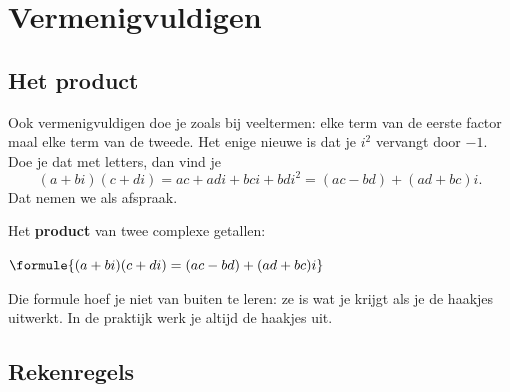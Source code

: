 
\begin{oefeningen}

\end{oefeningen}

\section{Vermenigvuldigen}

\subsection{Het product}

Ook vermenigvuldigen doe je zoals bij veeltermen: elke term van de eerste factor maal elke term van de tweede. Het enige nieuwe is dat je $i^2$ vervangt door $-1$. Doe je dat met letters, dan vind je
\[ (a + bi)(c + di) = ac + adi + bci + bdi^2 = (ac - bd) + (ad + bc)i . \]
Dat nemen we als afspraak.

\begin{theorie}
Het \textbf{\textcolor{accent}{product}} van twee complexe getallen:

\vspace{1mm}
\qquad $\formule{(a + bi)(c + di) = (ac - bd) + (ad + bc)i}$
\end{theorie}

Die formule hoef je niet van buiten te leren: ze is wat je krijgt als je de haakjes uitwerkt. In de praktijk werk je altijd de haakjes uit.


\subsection{Rekenregels}

